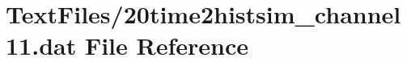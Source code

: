 \hypertarget{20time2histsim__channel11_8dat}{}\section{Text\+Files/20time2histsim\+\_\+channel11.dat File Reference}
\label{20time2histsim__channel11_8dat}
